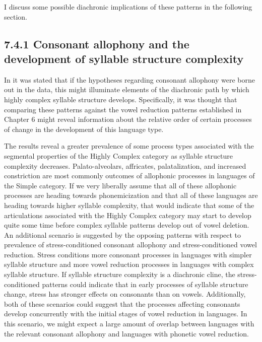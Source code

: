   I discuss some possible diachronic implications of these patterns in the following section.


\subsection{7.4.1 Consonant allophony and the development of syllable structure complexity} 

  In  it was stated that if the hypotheses regarding consonant allophony were borne out in the data, this might illuminate elements of the diachronic path by which highly complex syllable structure develops. Specifically, it was thought that comparing these patterns against the vowel reduction patterns established in Chapter 6 might reveal information about the relative order of certain processes of change in the development of this language type.



  The results reveal a greater prevalence of some process types associated with the segmental properties of the Highly Complex category as syllable structure complexity decreases. Palato-alveolars, affricates, palatalization, and increased constriction are most commonly outcomes of allophonic processes in languages of the Simple category. If we very liberally assume that all of these allophonic processes are heading towards phonemicization and that all of these languages are heading towards higher syllable complexity, that would indicate that some of the articulations associated with the Highly Complex category may start to develop quite some time before complex syllable patterns develop out of vowel deletion. An additional scenario is suggested by the opposing patterns with respect to prevalence of stress-conditioned consonant allophony and stress-conditioned vowel reduction. Stress conditions more consonant processes in languages with simpler syllable structure and more vowel reduction processes in languages with complex syllable structure. If syllable structure complexity is a diachronic cline, the stress-conditioned patterns could indicate that in early processes of syllable structure change, stress has stronger effects on consonants than on vowels. Additionally, both of these scenarios could suggest that the processes affecting consonants develop concurrently with the initial stages of vowel reduction in languages. In this scenario, we might expect a large amount of overlap between languages with the relevant consonant allophony and languages with phonetic vowel reduction.



